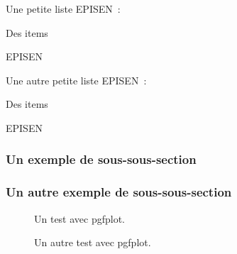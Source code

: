 \noindent Une petite liste EPISEN~:
\begin{itemizeRondEPISEN}
\item Des items
\item EPISEN
\end{itemizeRondEPISEN}

\noindent Une autre petite liste EPISEN~:
\begin{enumerateEPISEN}
\item Des items
\item EPISEN
\end{enumerateEPISEN}

\lipsum[7]

\lipsum[14]

\lipsum[11]

\subsubsection{Un exemple de sous-sous-section}

\lipsum[15]

\lipsum[18]

\subsubsection{Un autre exemple de sous-sous-section}

\lipsum[19]

\lipsum[20]

\lipsum[16]

\lipsum[17]

\begin{figure}[!t]
\begin{center}
\end{center}
\caption{Un test avec pgfplot.}
\label{fig:test1}
\end{figure}


\begin{figure}[!t]
\begin{center}
\end{center}
\caption{Un autre test avec pgfplot.}
\label{fig:test2}
\end{figure}



